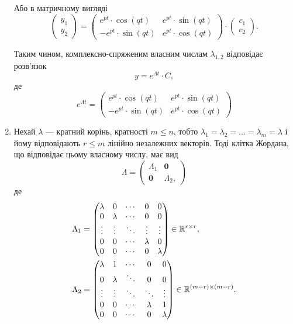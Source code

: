 \begin{enumerate}
Або в матричному вигляді
\begin{equation*}
	\begin{pmatrix} y_1 \\ y_2 \end{pmatrix} =
	\begin{pmatrix}
		e^{pt} \cdot \cos(qt) & e^{pt} \cdot \sin(qt) \\
		- e^{pt} \cdot \sin(qt) & e^{pt} \cdot \cos(qt)
	\end{pmatrix} \cdot
	\begin{pmatrix} c_1 \\ c_2 \end{pmatrix}.
\end{equation*}

Таким чином, комплексно-спряженим власним числам $\lambda_{1,2}$ відповідає розв’язок  
\begin{equation*}
	y = e^{\Lambda t} \cdot C,
\end{equation*}
де
\begin{equation*}
	e^{\Lambda t} =
	\begin{pmatrix}
		e^{pt} \cdot \cos(qt) & e^{pt} \cdot \sin(qt) \\
		- e^{pt} \cdot \sin(qt) & e^{pt} \cdot \cos(qt)
	\end{pmatrix} 
\end{equation*}

\item Нехай $\lambda$ --- кратний корінь, кратності $m \le n$, тобто $\lambda_1 = \lambda_2 = \ldots = \lambda_m = \lambda$ і йому відповідають $r \le m$ лінійно незалежних векторів. Тоді клітка Жордана, що відповідає цьому власному числу, має вид
\begin{equation*}
	\Lambda = 
	\begin{pmatrix}
		\Lambda_1 & \textbf{0} \\
		\textbf{0} & \Lambda_2, 
	\end{pmatrix}
\end{equation*}
де
\begin{align*}
	\Lambda_1 &= 
	\begin{pmatrix} 
		\lambda & 0 & \cdots & 0 & 0 \\
		0 & \lambda & \cdots & 0 & 0 \\
		\vdots & \vdots & \ddots & \vdots & \vdots \\
		0 & 0 & \cdots & \lambda & 0 \\
		0 & 0 & \cdots & 0 & \lambda
	\end{pmatrix} \in \mathbb{R}^{r \times r}, \\
	\Lambda_2 &= 
	\begin{pmatrix} 
		\lambda & 1 & \cdots & 0 & 0 \\
		0 & \lambda & \ddots & 0 & 0 \\
		\vdots & \vdots & \ddots & \ddots & \vdots \\
		0 & 0 & \cdots & \lambda & 1 \\
		0 & 0 & \cdots & 0 & \lambda
	\end{pmatrix} \in \mathbb{R}^{(m - r) \times (m - r)}.
\end{align*}
 

\end{enumerate}
